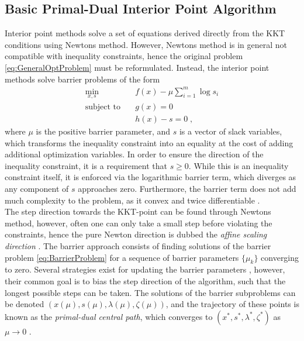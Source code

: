 \subsection{Basic Primal-Dual Interior Point Algorithm}
Interior point methods solve a set of equations derived directly from the KKT conditions using Newtons method. However, Newtons method is in general not compatible with inequality constraints, hence the original problem \eqref{eq:GeneralOptProblem} must be reformulated. Instead, the interior point methods solve barrier problems of the form 
\begin{subequations}	
 \begin{align}
	\min_{x,s} 			\quad & f(x) - \mu \sum_{i = 1}^{m} \log s_i \\
	\text{subject to} 	\quad & g(x) = 0  		\\ 
						   	  & h(x) - s  = 0 	\; ,
\end{align}
\label{eq:BarrierProblem}
\end{subequations}
where $\mu$ is the positive barrier parameter, and $s$ is a vector of slack variables, which transforms the inequality constraint into an equality at the cost of adding additional optimization variables. In order to ensure the direction of the inequality constraint, it is a requirement that $s \geq 0$. While this is an inequality constraint itself, it is enforced via the logarithmic barrier term, which diverges as any component of $s$ approaches zero. Furthermore, the barrier term does not add much complexity to the problem, as it convex and twice differentiable \cite{Wachter2006}.\\
The step direction towards the KKT-point can be found through Newtons method, however, often one can only take a small step before violating the constraints, hence the pure Newton direction is dubbed the \textit{affine scaling direction} \cite{wright}. The barrier approach consists of finding solutions of the barrier problem \eqref{eq:BarrierProblem} for a sequence of barrier parameters $\{ \mu_k \}$ converging to zero. Several strategies exist for updating the barrier parameters \cite{Byrd1997,Fiacco1990}, however, their common goal is to bias the step direction of the algorithm, such that the longest possible steps can be taken. The solutions of the barrier subproblems can be denoted $(x(\mu),s(\mu), \lambda(\mu),\zeta(\mu))$, and the trajectory of these points is known as the \textit{primal-dual central path}, which converges to $(x^*,s^*, \lambda^*,\zeta^*)$ as $\mu \to 0$ \cite{wright}.\\

